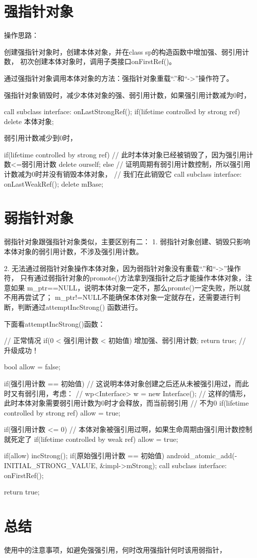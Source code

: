 \documentclass[a4paper,11pt]{article}
\begin{document}
\section[强指针对象]{强指针对象}
操作思路：

创建强指针对象时，创建本体对象，并在class sp的构造函数中增加强、弱引用计数，
初次创建本体对象时，调用子类接口onFirstRef()。

通过强指针对象调用本体对象的方法：强指针对象重载“.”和“->”操作符了。

强指针对象销毁时，减少本体对象的强、弱引用计数，如果强引用计数减为0时，

\begin{cppcode}
call subclass interface: onLastStrongRef();
if(lifetime controlled by strong ref) {
  delete 本体对象;
}
\end{cppcode}

弱引用计数减少到0时，

\begin{cppcode}
if(lifetime controlled by strong ref) {
  // 此时本体对象已经被销毁了，因为强引用计数<=弱引用计数
  delete ourself;
} else {
  // 证明周期有弱引用计数控制，所以强引用计数减为0时并没有销毁本体对象，
  // 我们在此销毁它
  call subclass interface: onLastWeakRef();
  delete mBase;
}
\end{cppcode}

\section[弱指针对象]{弱指针对象}
弱指针对象跟强指针对象类似，主要区别有二：
1. 弱指针对象创建、销毁只影响本体对象的弱引用计数，不涉及强引用计数。

2. 无法通过弱指针对象操作本体对象，因为弱指针对象没有重载“.”和“->”操作符，
只有通过弱指针对象的promote()方法拿到强指针之后才能操作本体对象，注意如果
m\_ptr==NULL，说明本体对象一定不，那么promte()一定失败，所以就不用再尝试了；
m\_ptr!=NULL不能确保本体对象一定就存在，还需要进行判断，判断通过attemptIncStrong()
函数进行。

下面看attemptIncStrong()函数：

\begin{cppcode}
// 正常情况
if(0 < 强引用计数 < 初始值) {
  增加强、弱引用计数;
  return true; // 升级成功！
}

bool allow = false;

if(强引用计数 == 初始值) {
  // 这说明本体对象创建之后还从未被强引用过，而此时又有弱引用，考虑：
  // wp<Interface> w = new Interface();
  // 这样的情形，此时本体对象需要弱引用计数为0时才会释放，而当前弱引用
  // 不为0
  if(lifetime controlled by strong ref)
    allow = true;
}

if(强引用计数 <= 0) {
  // 本体对象被强引用过啊，如果生命周期由强引用计数控制就死定了
  if(lifetime controlled by weak ref)
    allow = true;
}

if(allow)
  incStrong();
if(原始强引用计数 == 初始值) {
  android_atomic_add(-INITIAL_STRONG_VALUE, &impl->mStrong);
  call subclass interface: onFirstRef();
}

return true;
\end{cppcode}



\section[总结]{总结}
使用中的注意事项，如避免强强引用，何时改用强指针何时该用弱指针，
\end{document}
